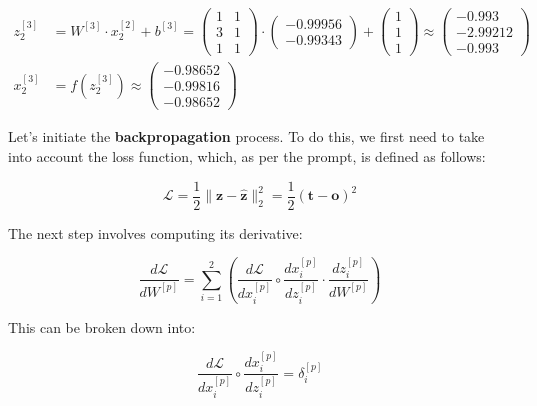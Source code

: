 \documentclass[12pt]{article}
\begin{document}
\begin{enumerate}[leftmargin=\labelsep]
\begin{align*}
                z^{[3]}_2 &= {W}^{[3]} \cdot {x}^{[2]}_2 + {b}^{[3]} = \begin{pmatrix} 1 & 1 \\ 3 & 1 \\ 1 & 1\end{pmatrix} \cdot  \begin{pmatrix} -0.99956 \\ -0.99343\end{pmatrix} +
                \begin{pmatrix} 1 \\ 1 \\ 1\end{pmatrix} \approx \begin{pmatrix} -0.993 \\ -2.99212 \\ -0.993\end{pmatrix} \\
                {x}^{[3]}_2 &= f\left({z}^{[3]}_2\right) \approx \begin{pmatrix} -0.98652 \\ -0.99816 \\ -0.98652\end{pmatrix}
            \end{align*}
            \endgroup

          Let's initiate the \textbf{backpropagation} process. To do this, we first need to take into account the loss function, which, as per the prompt, is defined as follows:

          \begin{equation}\label{ex2-loss}
            \mathcal{L} = \frac{1}{2} \|\mathbf{z} - \hat{\mathbf{z}}\|^{2}_{2} = \frac{1}{2} \left(\mathbf{t} - {\mathbf{o}}\right)^{2}
          \end{equation}

          The next step involves computing its derivative:

          \begin{equation}
            \frac{d\mathcal{L}}{dW^{[p]}} = \sum_{i=1}^{2} \left(\frac{d\mathcal{L}}{dx^{[p]}_i} \circ \frac{dx^{[p]}_i}{dz^{[p]}_i} \cdot \frac{dz^{[p]}_i}{dW^{[p]}} \right)
          \end{equation}

          This can be broken down into:

          \vskip -0.3cm
          \begin{equation*}
            \frac{d\mathcal{L}}{dx^{[p]}_i} \circ \frac{dx^{[p]}_i}{dz^{[p]}_i} = \delta^{[p]}_i
          \end{equation*}


\end{enumerate}
\end{document}
